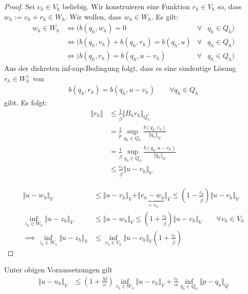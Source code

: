 \begin{proof}
	Sei $v_h\in V_h$ beliebig.
	Wir konstruieren eine Funktion $r_h\in V_h$ so, dass $w_h:=v_h+r_h\in W_h$.
	Wir wollen, dass $w_h\in W_h$.
	Es gilt:
	\begin{align*}
		w_h\in W_h
		&\Longleftrightarrow \Big(b(q_h,w_h)=0\qquad&\forall& q_h\in Q_h\Big)\\
		&\Longleftrightarrow \Big(b(q_h,v_h)+b(q_h,r_h)=b(q_h,u) &\forall&q_h\in Q_h\Big)\\
		&\Longleftrightarrow\Big( b(q_h,r_h)=b(q_h,u-v_h) &\forall&q_h\in Q_h\Big)
	\end{align*}
	Aus der diskreten inf-sup-Bedingung folgt, dass es eine eindeutige Lösung $r_h\in W_h^\perp$ von
	\begin{align*}
		b(q_h,r_h)=b(q_h,u-v_h)\qquad\forall q_h\in Q_h
	\end{align*}
	gibt. Es folgt:
	\begin{align*}
		\Vert r_h\Vert&\leq\frac{1}{\tilde{\beta}}\Vert B_h r_h\Vert_{Q_h^\ast}\\
		&=\frac{1}{\tilde{p}}\sup\limits_{q_h\in Q_h}\frac{b(q_h,r_h)}{\Vert q_h\Vert_Q}\\
		&=\frac{1}{\tilde{\beta}}\sup\limits_{q_h\in Q_h}\frac{b(q_h,u-v_h)}{\Vert q_h\Vert_Q}\\
		&\leq\frac{c_b}{\tilde{\beta}}\Vert u-v_h\Vert_V
	\end{align*}
	
	\begin{align*}
		\Vert u-w_h\Vert_V
		&\leq\Vert u-v_h\Vert_V+\Vert\underbrace{v_h-w_h}_{=r_h}\Vert_V
		\leq\left(1-\frac{c_b}{\tilde{\beta}}\right)\Vert u-v_h\Vert_V\\
		\inf\limits_{z_h\in W_h}\Vert u-z_h\Vert_V
		&\leq\Vert u-w_h\Vert_V
		\leq\left(1+\frac{c_b}{\tilde{\beta}}\right)\Vert u-v_h\Vert_V\qquad\forall v_h\in V_h\\
		\implies
		\inf\limits_{z_h\in W_h}\Vert u-z_h\Vert_V
		&\leq\inf\limits_{v_h\in V_h}\Vert u-v_h\Vert_V\left(1+\frac{c_b}{\tilde{\beta}}\right)
	\end{align*}
\end{proof}

\begin{theorem} %
	Unter obigen Voraussetzungen gilt
	\begin{align*}
		\Vert u-u_h\Vert_V&\leq\left(1+\frac{M}{\alpha}\right)\inf\limits_{v_h\in W_h}\Vert u-v_h\Vert_V+\frac{c_b}{\alpha}\inf\limits_{q_h\in Q_h}\Vert p-q_h\Vert_Q
	\end{align*}
\end{theorem}

